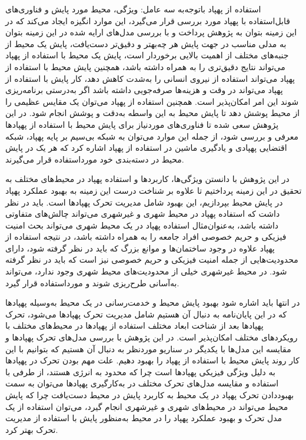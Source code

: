 استفاده از پهپاد باتوجه‌به سه عامل: ویژگی، محیط مورد پایش و فناوری‌های قابل‌استفاده با پهپاد مورد بررسی قرار می‌گیرد، این موارد انگیزه ایجاد می‌کند که در این زمینه بتوان به پژوهش پرداخت و با بررسی مدل‌های ارایه شده در این زمینه بتوان به مدلی مناسب در جهت پایش هر چه‌بهتر و دقیق‌تر دست‌یافت، پایش یک محیط از جنبه‌های مختلف از اهمیت بالایی برخوردار است، پایش یک محیط با استفاده از پهپاد می‌تواند نتایج دقیق‌تری را به همراه داشته باشد، همچنین پایش محیط با استفاده از پهپاد می‌تواند استفاده از نیروی انسانی را به‌شدت کاهش دهد، کار پایش با استفاده از پهپاد می‌تواند در وقت و هزینه‌ها صرفه‌جویی داشته باشد اگر به‌درستی برنامه‌ریزی شوند این امر امکان‌پذیر است. همچنین استفاده از پهپاد می‌توان یک مقایس عظیمی را از محیط پوشش دهد تا پایش محیط به این واسطه به‌دقت و پوشش انجام شود. در این پژوهش سعی شده تا فناوری‌های موردنیاز برای پایش محیط با استفاده از پهپادها معرفی و بررسی شود، از جمله این موارد می‌توان به شبکه بی‌سیم بر پایه پهپاد، شبکه اقتضایی پهپادی و یادگیری ماشین در استفاده از پهپاد اشاره کرد که هر یک در پایش محیط در دسته‌بندی خود مورداستفاده قرار می‌گیرند.


در این پژوهش با دانستن ویژگی‌ها، کاربردها و استفاده پهپاد در محیط‌های مختلف به تحقیق در این زمینه پرداختیم تا علاوه بر شناخت درست این زمینه به بهبود عملکرد پهپاد در پایش محیط بپردازیم، این بهبود شامل مدیریت تحرک پهپادها است. باید در نظر داشت که استفاده پهپاد در محیط شهری و غیرشهری می‌تواند چالش‌های متفاوتی داشته باشد، به‌عنوان‌مثال استفاده پهپاد در یک محیط شهری می‌تواند بحث امنیت فیزیکی و حریم خصوصی افراد جامعه را به همراه داشته باشد، در نتیجه استفاده از پهپاد علاوه در وجود ساختمان‌ها و موانع بزرگ که باید در نظر گرفته شود، دارای محدودیت‌هایی از جمله امنیت فیزیکی و حریم خصوصی نیز است که باید در نظر گرفته شود. در محیط غیرشهری خیلی از محدودیت‌های محیط شهری وجود ندارد، می‌تواند به‌آسانی طرح‌ریزی شوند و مورداستفاده قرار گیرد.


در انتها باید اشاره شود بهبود پایش محیط و خدمت‌رسانی در یک محیط به‌وسیله پهپادها که در این پایان‌نامه به دنبال آن هستیم شامل مدیریت تحرک پهپادها می‌شود، تحرک پهپادها بعد از شناخت ابعاد مختلف استفاده از پهپادها در محیط‌های مختلف با رویکردهای مختلف امکان‌پذیر است. در این پژوهش با بررسی مدل‌های تحرک پهپادها و مقایسه این مدل‌ها با یکدیگر در سناریو موردنظر به دنبال آن هستیم که بتوانیم با این کار روند پایش محیط با استفاده از پهپاد را بهبود دهیم. علت مهم بودن تحرک در پهپادها به دلیل ویژگی فیزیکی پهپادها است چرا که محدود به انرژی هستند، از طرفی با استفاده و مقایسه مدل‌های تحرک مختلف در به‌کارگیری پهپادها می‌توان به سمت بهبوددادن تحرک پهپاد در یک محیط به کاربرد پایش در محیط دست‌یافت چرا که پایش محیط می‌تواند در محیط‌های شهری و غیرشهری انجام گیرد، می‌توان استفاده از یک مدل تحرک و بهبود عملکرد پهپاد را در محیط به‌منظور پایش با استفاده از مدیریت تحرک بهتر کرد.


